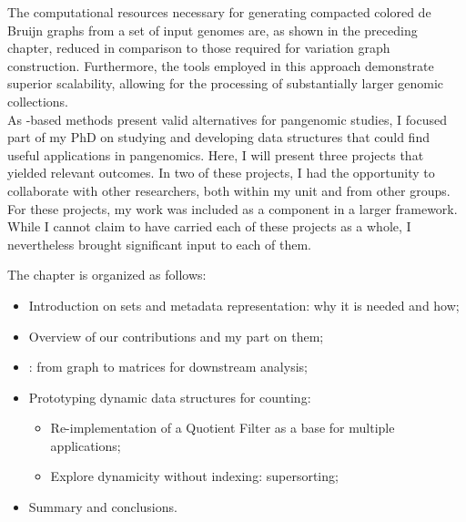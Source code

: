 The computational resources necessary for generating compacted colored de Bruijn graphs from a set of input genomes are, as shown in the preceding chapter, reduced in comparison to those required for variation graph construction. Furthermore, the tools employed in this approach demonstrate superior scalability, allowing for the processing of substantially larger genomic collections.\\
As \kmer-based methods present valid alternatives for pangenomic studies, I focused part of my PhD on studying and developing data structures that could find useful applications in pangenomics. Here, I will present three projects that yielded relevant outcomes. In two of these projects, I had the opportunity to collaborate with other researchers, both within my unit and from other groups. For these projects, my work was included as a component in a larger framework. While I cannot claim to have carried each of these projects as a whole, I nevertheless brought significant input to each of them.

The chapter is organized as follows:
\begin{itemize}
	\item Introduction on \kmer sets and metadata representation: why it is needed and how;
	\item Overview of our contributions and my part on them;
	\item \muset: from graph to matrices for downstream analysis;
	\item Prototyping dynamic data structures for \kmer counting:
	\begin{itemize}
		\item Re-implementation of a Quotient Filter as a base for multiple applications;
		\item Explore dynamicity without indexing: super\kmer sorting;
	\end{itemize}
	\item Summary and conclusions.
\end{itemize}

